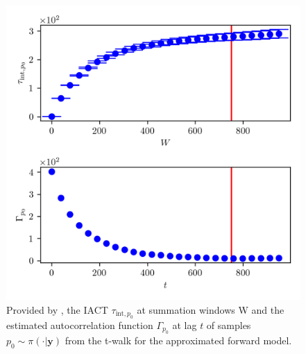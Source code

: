 \begin{figure}[ht!]
	\centering
	\includegraphics{UwerrTauIntTWalk5.png}
	\caption[IACT and autocorrelation function of samples $p_0 \sim \pi(\cdot|\bm{y})$, for approximated model.]{Provided by \cite{drikHesse}, the IACT $\tau_{\text{int},p_0}$ at summation windows W and the estimated autocorrelation function $\Gamma_{p_0}$ at lag $t$ of samples $p_0 \sim \pi( \cdot| \bm{y})$ from the t-walk for the approximated forward model.}
	\label{fig:TWalkIATC6}
\end{figure}



